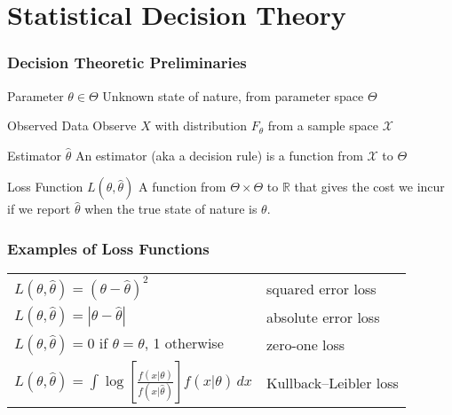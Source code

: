 \section{Statistical Decision Theory}
\begin{frame}
  \frametitle{Decision Theoretic Preliminaries}

  \begin{block}{Parameter $\theta \in \Theta$}
    Unknown state of nature, from parameter space $\Theta$ 
  \end{block}

  \begin{block}{Observed Data}
    Observe $X$ with distribution $F_\theta$ from a sample space $\mathcal{X}$ 
  \end{block}

  \begin{block}{Estimator $\widehat{\theta}$}
    An estimator (aka a decision rule) is a function from $\mathcal{X}$ to $\Theta$
  \end{block}

  \begin{block}{Loss Function $L(\theta,\widehat{\theta})$}
    A function from $\Theta \times \Theta$ to $\mathbb{R}$ that gives the cost we incur if we report $\widehat{\theta}$ when the true state of nature is $\theta$.
  \end{block}

  
\end{frame}
\begin{frame}
  \frametitle{Examples of Loss Functions}

  \begin{table}
    \centering
    \begin{tabular}{ll}
      $L(\theta, \widehat{\theta}) = ( \theta - \widehat{\theta})^2$ & squared error loss\\
      $L(\theta, \widehat{\theta}) = |\theta - \widehat{\theta}|$ & absolute error loss\\
      $L(\theta, \widehat{\theta}) = 0$ if $\theta = \widehat{\theta}$, 1 otherwise & zero-one loss \\ 
      $L(\theta, \widehat{\theta}) = \int \log \left[ \frac{f(x|\theta)}{f(x|\widehat{\theta})} \right] f(x|\theta)\, dx$ & Kullback--Leibler loss\\
    \end{tabular}
  \end{table}


\end{frame}
